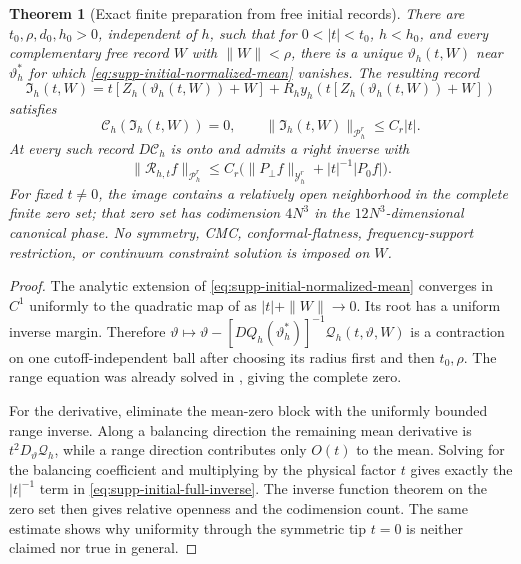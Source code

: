 \documentclass[11pt]{article}
\newtheorem{theorem}{Theorem}[section]
\theoremstyle{definition}
\theoremstyle{remark}
\begin{document}
\begin{theorem}[Exact finite preparation from free initial records]
\label{thm:supp-action-prepared-chart}
There are $t_0,\rho,d_0,h_0>0$, independent of $h$, such that for
$0<|t|<t_0$, $h<h_0$, and every complementary free record $W$ with
$\|W\|<\rho$, there is a unique $\vartheta_h(t,W)$ near
$\vartheta_h^*$ for which \eqref{eq:supp-initial-normalized-mean} vanishes.
The resulting record
\begin{equation}
 \boxed{\mathfrak I_h(t,W)
 =t[Z_h(\vartheta_h(t,W))+W]
   +R_hy_h(t[Z_h(\vartheta_h(t,W))+W])}
 \label{eq:supp-initial-prepared-record}
\end{equation}
satisfies
\begin{equation}
 \mathscr C_h(\mathfrak I_h(t,W))=0,
 \qquad \|\mathfrak I_h(t,W)\|_{\mathcal P_h^r}\le C_r|t|.
 \label{eq:supp-initial-exact-zero}
\end{equation}
At every such record $D\mathscr C_h$ is onto and admits a right inverse with
\begin{equation}
 \boxed{\|\mathscr R_{h,t}f\|_{\mathcal P_h^r}
 \le C_r\bigl(\|P_\perp f\|_{\mathcal Y_h^r}+|t|^{-1}|P_0f|\bigr).}
 \label{eq:supp-initial-full-inverse}
\end{equation}
For fixed $t\ne0$, the image contains a relatively open neighborhood in the
complete finite zero set; that zero set has codimension $4N^3$ in the
$12N^3$-dimensional canonical phase.  No symmetry, CMC, conformal-flatness,
frequency-support restriction, or continuum constraint solution is imposed
on $W$.
\end{theorem}
\begin{proof}
The analytic extension of \eqref{eq:supp-initial-normalized-mean} converges in
$C^1$ uniformly to the quadratic map of
 as $|t|+\|W\|\to0$.  Its root has a uniform
inverse margin.  Therefore
$\vartheta\mapsto\vartheta-[DQ_h(\vartheta_h^*)]^{-1}
\mathcal Q_h(t,\vartheta,W)$ is a contraction on one cutoff-independent ball
after choosing its radius first and then $t_0,\rho$.  The range equation was
already solved in , giving the complete zero.

For the derivative, eliminate the mean-zero block with the uniformly bounded
range inverse.  Along a balancing direction the remaining mean derivative is
$t^2D_\vartheta\mathcal Q_h$, while a range direction contributes only
$O(t)$ to the mean.  Solving for the balancing coefficient and multiplying by
the physical factor $t$ gives exactly the $|t|^{-1}$ term in
\eqref{eq:supp-initial-full-inverse}.  The inverse function theorem on the
zero set then gives relative openness and the codimension count.  The same
estimate shows why uniformity through the symmetric tip $t=0$ is neither
claimed nor true in general.
\end{proof}
\end{document}

